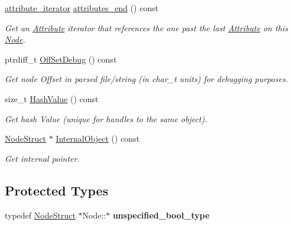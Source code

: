 \begin{DoxyCompactItemize}
\hyperlink{classphys_1_1xml_1_1AttributeIterator}{attribute\_\-iterator} \hyperlink{classphys_1_1xml_1_1Node_ac2535dd3ebc22454993f09fb66ace134}{attributes\_\-end} () const 
\begin{DoxyCompactList}\small\item\em Get an \hyperlink{classphys_1_1xml_1_1Attribute}{Attribute} iterator that references the one past the last \hyperlink{classphys_1_1xml_1_1Attribute}{Attribute} on this \hyperlink{classphys_1_1xml_1_1Node}{Node}. \item\end{DoxyCompactList}\item 
ptrdiff\_\-t \hyperlink{classphys_1_1xml_1_1Node_add5c56d3e9bef050c774b9aa97240e98}{OffSetDebug} () const 
\begin{DoxyCompactList}\small\item\em Get node Offset in parsed file/string (in char\_\-t units) for debugging purposes. \item\end{DoxyCompactList}\item 
size\_\-t \hyperlink{classphys_1_1xml_1_1Node_a830a1833c4b4b012f1b4481e91ccb1ca}{HashValue} () const 
\begin{DoxyCompactList}\small\item\em Get hash Value (unique for handles to the same object). \item\end{DoxyCompactList}\item 
\hyperlink{structphys_1_1xml_1_1NodeStruct}{NodeStruct} $\ast$ \hyperlink{classphys_1_1xml_1_1Node_a0d2c64c909e7545d01b586fe9d0bd9d4}{InternalObject} () const 
\begin{DoxyCompactList}\small\item\em Get internal pointer. \item\end{DoxyCompactList}\end{DoxyCompactItemize}
\subsection*{Protected Types}
\begin{DoxyCompactItemize}
\item 
\hypertarget{classphys_1_1xml_1_1Node_abace2c2c7e70431d920579917417c1e4}{
typedef \hyperlink{structphys_1_1xml_1_1NodeStruct}{NodeStruct} $\ast$Node::$\ast$ {\bfseries unspecified\_\-bool\_\-type}}
\label{d7/d0a/classphys_1_1xml_1_1Node_abace2c2c7e70431d920579917417c1e4}

\end{DoxyCompactItemize}
